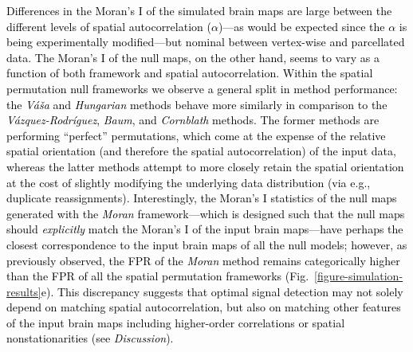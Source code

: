 \documentclass[12pt,aps,pra,reprint,showkeys]{revtex4-1}
\newcommand{\nimg}[1]{\textcolor{black}{{#1}}}
\begin{document}
\nimg{Differences in the Moran's I of the simulated brain maps are large between the different levels of spatial autocorrelation ($\alpha$)---as would be expected since the $\alpha$ is being experimentally modified---but nominal between vertex-wise and parcellated data.
The Moran's I of the null maps, on the other hand, seems to vary as a function of both framework and spatial autocorrelation.
Within the spatial permutation null frameworks we observe a general split in method performance: the \textit{V\'a\v{s}a} and \textit{Hungarian} methods behave more similarly in comparison to the \textit{V{\'a}zquez-Rodr{\'i}guez}, \textit{Baum}, and \textit{Cornblath} methods.
The former methods are performing ``perfect'' permutations, which come at the expense of the relative spatial orientation (and therefore the spatial autocorrelation) of the input data, whereas the latter methods attempt to more closely retain the spatial orientation at the cost of slightly modifying the underlying data distribution (via e.g., duplicate reassignments).
Interestingly, the Moran's I statistics of the null maps generated with the \textit{Moran} framework---which is designed such that the null maps should \emph{explicitly} match the Moran's I of the input brain maps---have perhaps the closest correspondence to the input brain maps of all the null models; however, as previously observed, the FPR of the \textit{Moran} method remains categorically higher than the FPR of all the spatial permutation frameworks (Fig.~\ref{figure-simulation-results}e).
This discrepancy suggests that optimal signal detection may not solely depend on matching spatial autocorrelation, but also on matching other features of the input brain maps including higher-order correlations or spatial nonstationarities (see \emph{Discussion}).}
\end{document}
